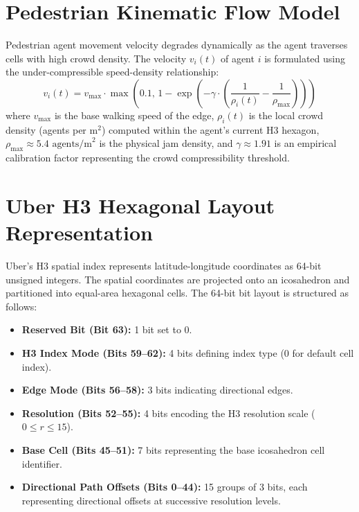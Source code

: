 \documentclass[12pt,a4paper,oneside]{report}
\begin{document}
\section{Pedestrian Kinematic Flow Model}
Pedestrian agent movement velocity degrades dynamically as the agent traverses cells with high crowd density. The velocity $v_i(t)$ of agent $i$ is formulated using the under-compressible speed-density relationship:
\begin{equation}
v_i(t) = v_{\max} \cdot \max\left(0.1, \, 1 - \exp\left(-\gamma \cdot \left(\frac{1}{\rho_i(t)} - \frac{1}{\rho_{\max}}\right)\right)\right)
\label{eq:kinematic}
\end{equation}
where $v_{\max}$ is the base walking speed of the edge, $\rho_i(t)$ is the local crowd density (agents per $\text{m}^2$) computed within the agent's current H3 hexagon, $\rho_{\max} \approx 5.4 \text{ agents/m}^2$ is the physical jam density, and $\gamma \approx 1.91$ is an empirical calibration factor representing the crowd compressibility threshold.

\section{Uber H3 Hexagonal Layout Representation}
Uber's H3 spatial index represents latitude-longitude coordinates as 64-bit unsigned integers. The spatial coordinates are projected onto an icosahedron and partitioned into equal-area hexagonal cells. The 64-bit bit layout is structured as follows:
\begin{itemize}
    \item \textbf{Reserved Bit (Bit 63):} 1 bit set to 0.
    \item \textbf{H3 Index Mode (Bits 59--62):} 4 bits defining index type (0 for default cell index).
    \item \textbf{Edge Mode (Bits 56--58):} 3 bits indicating directional edges.
    \item \textbf{Resolution (Bits 52--55):} 4 bits encoding the H3 resolution scale ($0 \le r \le 15$).
    \item \textbf{Base Cell (Bits 45--51):} 7 bits representing the base icosahedron cell identifier.
    \item \textbf{Directional Path Offsets (Bits 0--44):} 15 groups of 3 bits, each representing directional offsets at successive resolution levels.
\end{itemize}
\end{document}
